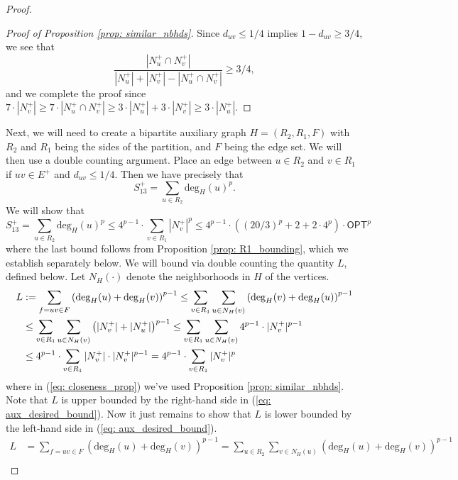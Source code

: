 \begin{proof}
\begin{proof}[Proof of Proposition \ref{prop: similar_nbhds}]
    Since $d_{uv} \leq 1/4$ implies $1-d_{uv} \geq 3/4$, we see that
    \[\frac{|N_u^+ \cap N_v^+|}{|N_u^+| + |N_v^+| - |N_u^+ \cap N_v^+|} \geq 3/4,\]
    and we complete the proof since
    $7\cdot|N_v^+| \geq 7\cdot|N_u^+ \cap N_v^+| \geq 3\cdot|N_u^+| + 3\cdot|N_v^+| \geq 3\cdot|N_u^+|.$
\end{proof}
Next, we will need to create a bipartite auxiliary graph $H = (R_2, R_1, F)$ with $R_2$ and $R_1$ being the sides of the partition, and $F$ being the edge set. We will then use a double counting argument. Place an edge between $u \in R_2$ and $v \in R_1$ if $uv \in E^+$ and $d_{uv} \leq 1/4$. Then we have precisely that 
\[S_{13}^+ = \sum_{u \in R_2} \text{deg}_{H}(u)^p.\] 
 We will show that 
\begin{equation} \label{eq: aux_desired_bound}
  \boxed{S_{13}^+ = \sum_{u \in R_2} \text{deg}_H(u)^p \leq  4^{p-1} \cdot \sum_{v \in R_1} |N_v^+|^p \leq 4^{p-1} \cdot \left((20/3)^p + 2 + 2 \cdot 4^p \right) \cdot \textsf{OPT}^p}
\end{equation}
where the last bound  follows from Proposition \ref{prop: R1_bounding}, which we establish separately below. We will bound via double counting the quantity $L$, defined below. Let $N_H(\cdot)$ denote the neighborhoods in $H$ of the vertices. 
\begin{align}
    L &:= \sum_{f=uv \in F} \left(\text{deg}_H(u) + \text{deg}_H(v) \right)^{p-1}  
    \leq \sum_{v \in R_1} \sum_{u \in N_{H}(v)} \left(\text{deg}_H(v) + \text{deg}_H(u) \right)^{p-1} \notag \\
    &\leq \sum_{v \in R_1} \sum_{u \in N_{H}(v)} \left( |N_v^+| + |N_u^+| \right)^{p-1}  
    \leq \sum_{v \in R_1} \sum_{u \in N_{H}(v)} 4^{p-1} \cdot |N_v^+|^{p-1} \label{eq: closeness_prop} \\
    &\leq 4^{p-1} \cdot \sum_{v \in R_1} |N_v^+| \cdot |N_v^+|^{p-1} \notag 
    = 4^{p-1} \cdot \sum_{v \in R_1} |N_v^+|^p \notag
\end{align}
 where in (\ref{eq: closeness_prop}) we've used Proposition \ref{prop: similar_nbhds}. Note that $L$ is upper bounded by the right-hand side in (\ref{eq: aux_desired_bound}). Now it just remains to show that $L$ is lower bounded by the left-hand side in (\ref{eq: aux_desired_bound}).
\begin{align*}
    L &= \sum_{f=uv \in F} \left(\text{deg}_H(u) + \text{deg}_H(v) \right)^{p-1} 
    = \sum_{u \in R_2} \sum_{v \in N_H(u)} \left(\text{deg}_H(u) + \text{deg}_H(v) \right)^{p-1} \\

\end{align*}
\end{proof}
